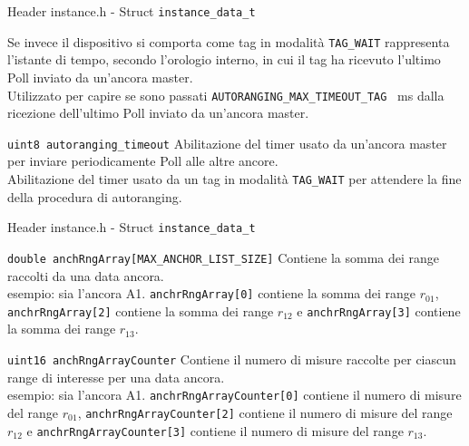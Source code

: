 \begin{frame}[fragile]{Header instance.h - Struct \lstinline!instance_data_t!}
  \begin{block}{}
    Se invece il dispositivo si comporta come tag in modalità \lstinline!TAG_WAIT! rappresenta l'istante di tempo, secondo l'orologio
    interno, in cui il tag ha ricevuto l'ultimo Poll inviato da un'ancora master.\\
    Utilizzato per capire se sono passati \lstinline!AUTORANGING_MAX_TIMEOUT_TAG! \SI{}{\milli\second} dalla ricezione
    dell'ultimo Poll inviato da un'ancora master.
  \end{block}
  \begin{block}{\lstinline!uint8 autoranging_timeout!}
    Abilitazione del timer usato da un'ancora master per inviare periodicamente Poll alle altre ancore.\\
    Abilitazione del timer usato da un tag in modalità \lstinline!TAG_WAIT! per attendere la fine della
    procedura di autoranging.
  \end{block}
\end{frame}

\begin{frame}[fragile]{Header instance.h - Struct \lstinline!instance_data_t!}
  \begin{block}{\lstinline!double anchRngArray[MAX_ANCHOR_LIST_SIZE]!}
    Contiene la somma dei range raccolti da una data ancora.\\
    \textcolor{dgreen}{esempio:} sia l'ancora A1. \lstinline!anchrRngArray[0]! contiene la somma dei range $r_{01}$,
    \lstinline!anchrRngArray[2]! contiene la somma dei range $r_{12}$ e \lstinline!anchrRngArray[3]! contiene la somma dei range $r_{13}$.
  \end{block}
  \begin{block}{\lstinline!uint16 anchRngArrayCounter!}
    Contiene il numero di misure raccolte per ciascun range di interesse per una data ancora.\\
    \textcolor{dgreen}{esempio:} sia l'ancora A1. \lstinline!anchrRngArrayCounter[0]! contiene il numero di misure del range $r_{01}$,
    \lstinline!anchrRngArrayCounter[2]! contiene il numero di misure del range $r_{12}$ e \lstinline!anchrRngArrayCounter[3]! contiene il numero di misure del range $r_{13}$.
  \end{block}
\end{frame}

